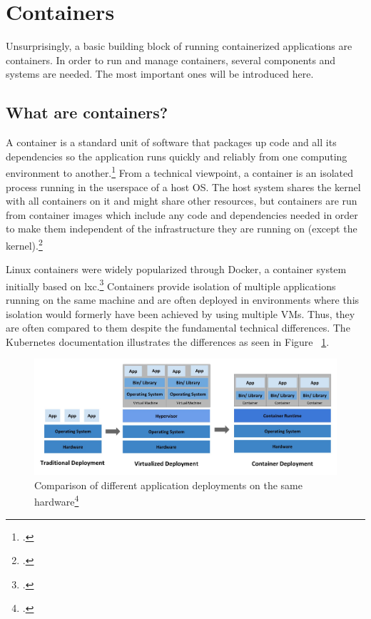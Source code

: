 \section{Containers}

Unsurprisingly, a basic building block of running containerized applications are containers.
In order to run and manage containers, several components and systems are needed. The most important ones will be introduced here.

\subsection{What are containers?}
A container is a standard unit of software that packages up code and all its dependencies so the application runs quickly and reliably from one computing environment to another.\footcite[][, section 'Package Software into Standardized Units for Development, Shipment and Deployment']{whatContainer}
From a technical viewpoint, a container is an isolated process running in the userspace of a host OS. The host system shares the kernel with all containers on it and might share other resources, but containers are run from container images which include any code and dependencies needed in order to make them independent of the infrastructure they are running on (except the kernel).\footcite[][, slide 13]{containerIntro}

Linux containers were widely popularized through Docker, a container system initially based on \gls{lxc}.\footcite[][, section '2013: Docker']{containerHistory}
Containers provide isolation of multiple applications running on the same machine and are often deployed in environments where this isolation would formerly have been achieved by using multiple VMs. Thus, they are often compared to them despite the fundamental technical differences. The Kubernetes documentation illustrates the differences as seen in Figure ~\ref{fig:VMsVsContainers}.

\begin{figure}[H]
\includegraphics[scale=0.3]{pictures/VMsVsContainers.jpg} 
\caption{Comparison of different application deployments on the same hardware\protect\footcite[][, section 'Going back in time']{k8sBasics}}
\label{fig:VMsVsContainers}
\end{figure}

